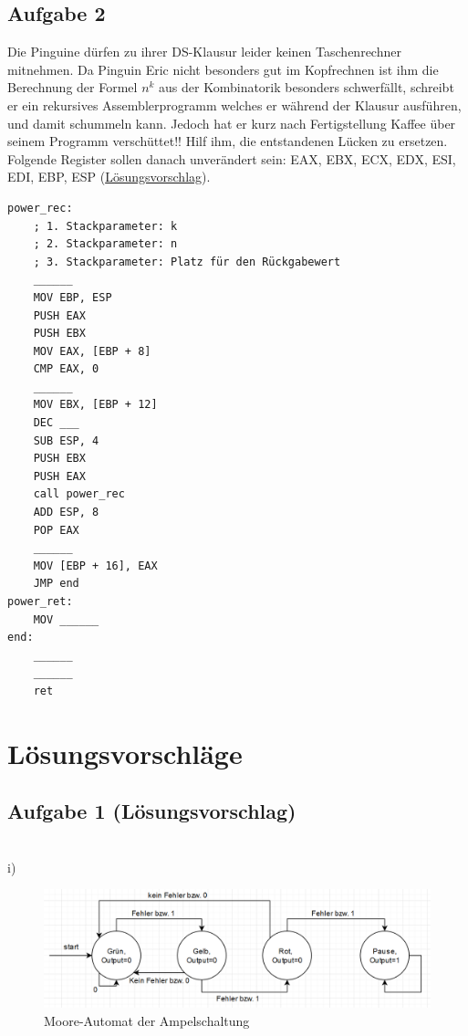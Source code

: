 \documentclass{article}
\begin{document}
\subsection{Aufgabe 2}
Die Pinguine dürfen zu ihrer DS-Klausur leider keinen Taschenrechner mitnehmen. Da Pinguin Eric nicht besonders gut im Kopfrechnen ist ihm die Berechnung der Formel $n^k$ aus der Kombinatorik besonders schwerfällt, schreibt er ein rekursives Assemblerprogramm welches er während der Klausur ausführen, und damit schummeln kann. Jedoch hat er kurz nach Fertigstellung Kaffee über seinem Programm verschüttet!!
Hilf ihm, die entstandenen Lücken zu ersetzen.
Folgende Register sollen danach unverändert sein:
EAX, EBX, ECX, EDX, ESI, EDI, EBP, ESP (\hyperref[sec:lsg02]{Lösungsvorschlag}).
\begin{verbatim}
power_rec:
    ; 1. Stackparameter: k
    ; 2. Stackparameter: n
    ; 3. Stackparameter: Platz für den Rückgabewert
    ______
    MOV EBP, ESP
    PUSH EAX
    PUSH EBX
    MOV EAX, [EBP + 8]
    CMP EAX, 0
    ______
    MOV EBX, [EBP + 12]
    DEC ___
    SUB ESP, 4
    PUSH EBX
    PUSH EAX
    call power_rec
    ADD ESP, 8
    POP EAX
    ______
    MOV [EBP + 16], EAX
    JMP end
power_ret:
    MOV ______
end:
    ______
    ______
    ret
\end{verbatim}

\newpage

\section{Lösungsvorschläge}

\subsection{Aufgabe 1 (Lösungsvorschlag)} \\
i)
\begin{figure}[H]
\centering
\includegraphics[scale=0.45]{automat.png}
\caption{Moore-Automat der Ampelschaltung}
\end{figure}
\end{document}
